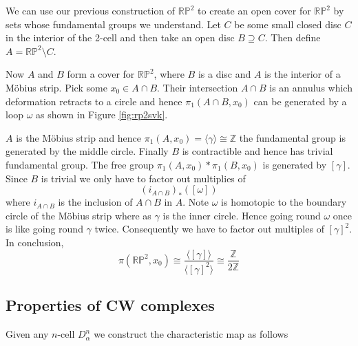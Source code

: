 \documentclass[11pt]{article}
\newcommand{\Z}{\mathbb{Z}}
\newcommand{\RP}{\mathbb{R}\mathbb{P}}
\begin{document}
We can use our previous construction of $\RP^2$ to create an open cover for $\RP^2$ by sets whose fundamental groups we understand.
Let $C$ be some small closed disc $C$ in the interior of the 2-cell and then take an open disc $B\supseteq C$.
Then define $A=\RP^2\setminus C$.

Now $A$ and $B$ form a cover for $\RP^2$, where $B$ is a disc and $A$ is the interior of a M\"obius strip.
Pick some $x_0\in A\cap B$.
Their intersection $A\cap B$ is an annulus which deformation retracts to a circle and hence $\pi_1(A\cap B, x_0)$ can be generated by a loop $\omega$ as shown in Figure \ref{fig:rp2svk}.

$A$ is the M\"obius strip and hence $\pi_1(A, x_0)=\langle\gamma\rangle\cong\Z$ the fundamental group is generated by the middle circle.
Finally $B$ is contractible and hence has trivial fundamental group.
The free group $\pi_1(A, x_0) \ast \pi_1(B, x_0)$ is generated by $\left[\gamma\right]$.
Since $B$ is trivial we only have to factor out multiplies of
\[
	(i_{A\cap B})_\ast(\left[\omega\right])
\]
where $i_{A\cap B}$ is the inclusion of $A\cap B$ in $A$.
Note $\omega$ is homotopic to the boundary circle of the M\"obius strip where as $\gamma$ is the inner circle.
Hence going round $\omega$ once is like going round $\gamma$ twice.
Consequently we have to factor out multiples of $\left[\gamma\right]^2$.
In conclusion,
\[
	\pi(\RP^2, x_0)\cong\frac{\langle\left[\gamma\right]\rangle}{\langle\left[\gamma\right]^2\rangle}\cong\frac{\Z}{2\Z}
\]

\subsection{Properties of CW complexes}
Given any $n$-cell $D_\alpha^n$ we construct the characteristic map as follows
\begin{figure}[H]
	\centering
\end{figure}
\end{document}
